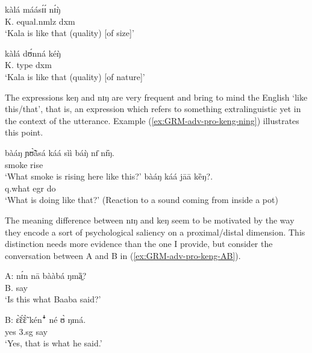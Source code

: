 \begin{exe}
\begin{exe}
\begin{exe}
{\begin{exe}
\begin{exe}
\begin{exe}
\begin{exe}
\begin{exe}
\begin{exe}
\begin{exe}
\begin{exe}
\begin{exe}
\begin{exe}
\begin{exe}
\begin{exe}
\begin{exe}
\begin{exe}
\begin{exe}
\begin{exe}
\begin{exe}
\begin{exe}
\begin{exe}
\begin{exe}
\begin{exe}
  \ex\label{ex:GRM-dxm-}
  
  
\gll  kàlá máásɪ́ɪ́ nɪ́ŋ̀\\
K. equal.{\sc nmlz} {\sc dxm}\\
\glt `Kala is like that (quality) [of size]'  

  \ex\label{ex:GRM-dxm-}
  
  
\gll kàlá dʊ́nná kéŋ̀\\
K. type {\sc dxm}\\
\glt `Kala is like that (quality) [of nature]'  

\z 
 \z   

The expressions  {\sls keŋ} and {\sls nɪŋ} are very frequent  and bring
to mind the  English  `like this/that',  that is,  an expression which 
refers to something extralinguistic yet in  the context of the utterance. 
Example (\ref{ex:GRM-adv-pro-keng-ning}) illustrates this point.


\ea\label{ex:GRM-adv-pro-keng-ning}

 \ea\label{ex:GRM-adv-pro-ning}
\gll bàáŋ ɲʊ̃̀ã̀sá káá sìì báŋ̀ nɪ̄ nɪ̏ŋ.\\
{\q}  smoke  {\egr} rise {\dem} {\postp} {\advm}\\
\glt `What smoke is rising here like this?'  
  \ex\label{ex:GRM-adv-pro-keng}
 \gll bàáŋ káá jāā kȅŋ?.\\
  {\sc q}.what {\sc egr} do  {\advm}\\ 
 \glt `What is doing like that?' (Reaction to a sound coming from inside a pot)

\z 
 \z   

The meaning difference between   {\sls nɪŋ}  and {\sls 
keŋ} seem to be 
motivated by the way they  encode a sort of psychological saliency on a
proximal/distal dimension. This distinction needs more evidence than the one I
provide,  but consider the conversation between A and B in
(\ref{ex:GRM-adv-pro-keng-AB}). 


\ea\label{ex:GRM-adv-pro-keng-AB}

 \ea\label{ex:GRM-adv-pro-A}
\gll A: nɪ́n nā bààbá ŋmȁ̠?\\
 {} {\advm} {\foc} B. say\\
\glt `Is this what Baaba said?'

  \ex\label{ex:GRM-adv-pro-B}
 \gll B: ɛ̃̀ɛ̃́ɛ̃̀ kén{\T ꜜ} né ʊ̀ ŋmá.\\
 {} yes {\advm} {\foc} {\sc 3.sg} say\\
\glt `Yes, that is what he said.'
 

\end{exe}
\end{exe}
\end{exe}
\end{exe}
\end{exe}
\end{exe}
\end{exe}
\end{exe}
\end{exe}
\end{exe}
\end{exe}
\end{exe}
\end{exe}
\end{exe}
\end{exe}
\end{exe}
\end{exe}
\end{exe}
\end{exe}
\end{exe}
\end{exe}}
\end{exe}
\end{exe}
\end{exe}
